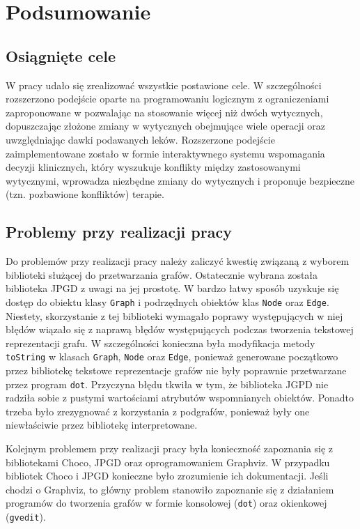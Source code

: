 \chapter{Podsumowanie}

\section{Osiągnięte cele}
W pracy udało się zrealizować wszystkie postawione cele. W szczególności rozszerzono podejście oparte na programowaniu logicznym z ograniczeniami zaproponowane w \cite{SzWilk2} pozwalając na stosowanie więcej niż dwóch wytycznych, dopuszczając złożone zmiany w wytycznych obejmujące wiele operacji oraz uwzględniając dawki podawanych leków. Rozszerzone podejście zaimplementowane zostało w formie interaktywnego systemu wspomagania decyzji klinicznych, który wyszukuje konflikty między zastosowanymi wytycznymi, wprowadza niezbędne zmiany do wytycznych i proponuje bezpieczne (tzn. pozbawione konfliktów) terapie.

\section{Problemy przy realizacji pracy}
Do problemów przy realizacji pracy należy zaliczyć kwestię związaną z wyborem biblioteki służącej do przetwarzania grafów. Ostatecznie wybrana została biblioteka JPGD z uwagi na jej prostotę. W bardzo łatwy sposób uzyskuje się dostęp do obiektu klasy \texttt{Graph} i podrzędnych obiektów klas \texttt{Node} oraz \texttt{Edge}. Niestety, skorzystanie z tej biblioteki wymagało poprawy występujących w niej błędów wiązało się z naprawą błędów występujących podczas tworzenia tekstowej reprezentacji grafu. W szczególności konieczna była modyfikacja metody \texttt{toString} w klasach \texttt{Graph}, \texttt{Node} oraz \texttt{Edge}, ponieważ generowane początkowo przez bibliotekę tekstowe reprezentacje grafów nie były poprawnie przetwarzane przez program \texttt{dot}. Przyczyna błędu tkwiła w tym, że biblioteka JGPD nie radziła sobie z pustymi wartościami atrybutów wspomnianych obiektów. Ponadto trzeba było zrezygnować z korzystania z podgrafów, ponieważ były one niewłaściwie przez bibliotekę interpretowane. 

Kolejnym problemem przy realizacji pracy była konieczność zapoznania się z bibliotekami Choco, JPGD oraz oprogramowaniem Graphviz. W przypadku bibliotek Choco i JPGD konieczne było zrozumienie ich dokumentacji. Jeśli chodzi o Graphviz, to główny problem stanowiło zapoznanie się z działaniem programów do tworzenia grafów w formie konsolowej (\texttt{dot}) oraz okienkowej (\texttt{gvedit}).


